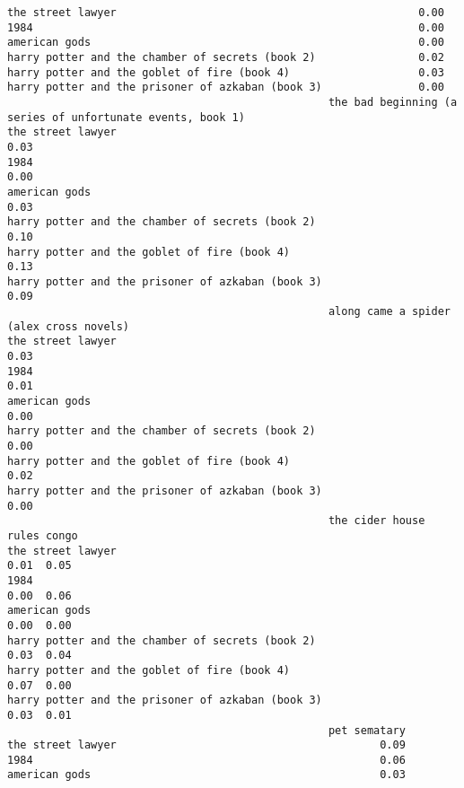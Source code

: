 \documentclass[
]{report}
\begin{document}
\begin{verbatim}
the street lawyer                                               0.00
1984                                                            0.00
american gods                                                   0.00
harry potter and the chamber of secrets (book 2)                0.02
harry potter and the goblet of fire (book 4)                    0.03
harry potter and the prisoner of azkaban (book 3)               0.00
                                                  the bad beginning (a series of unfortunate events, book 1)
the street lawyer                                                                                       0.03
1984                                                                                                    0.00
american gods                                                                                           0.03
harry potter and the chamber of secrets (book 2)                                                        0.10
harry potter and the goblet of fire (book 4)                                                            0.13
harry potter and the prisoner of azkaban (book 3)                                                       0.09
                                                  along came a spider (alex cross novels)
the street lawyer                                                                    0.03
1984                                                                                 0.01
american gods                                                                        0.00
harry potter and the chamber of secrets (book 2)                                     0.00
harry potter and the goblet of fire (book 4)                                         0.02
harry potter and the prisoner of azkaban (book 3)                                    0.00
                                                  the cider house rules congo
the street lawyer                                                  0.01  0.05
1984                                                               0.00  0.06
american gods                                                      0.00  0.00
harry potter and the chamber of secrets (book 2)                   0.03  0.04
harry potter and the goblet of fire (book 4)                       0.07  0.00
harry potter and the prisoner of azkaban (book 3)                  0.03  0.01
                                                  pet sematary
the street lawyer                                         0.09
1984                                                      0.06
american gods                                             0.03

\end{verbatim}
\end{document}
